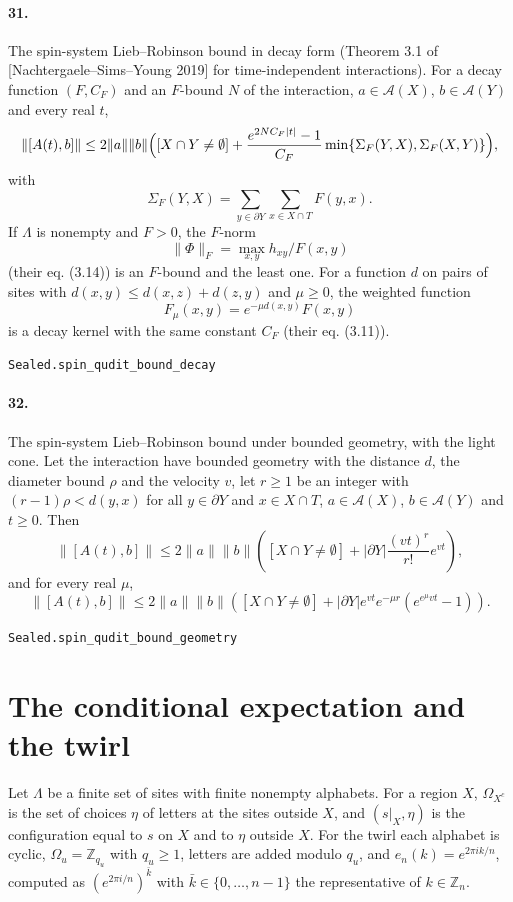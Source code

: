 \documentclass[11pt]{article}
\begin{document}
\paragraph{31.} The spin-system Lieb–Robinson bound in decay form (Theorem 3.1 of [Nachtergaele–Sims–Young 2019] for time-independent interactions). For a decay function $(F, C_F)$ and an $F$-bound $N$ of the interaction, $a \in \mathcal A(X)$, $b \in \mathcal A(Y)$ and every real $t$, \[\|[A(t), b]\| \le 2\|a\|\|b\|\Bigl([X \cap Y \neq \emptyset] + \frac{e^{2 N C_F |t|} - 1}{C_F} \min\{\Sigma_F(Y, X), \Sigma_F(X, Y)\}\Bigr),\] with \[\Sigma_F(Y, X) = \sum_{y \in \partial Y} \sum_{x \in X \cap T} F(y, x).\] If $\Lambda$ is nonempty and $F > 0$, the $F$-norm \[\|\Phi\|_F = \max_{x, y} h_{x y} / F(x, y)\] (their eq. (3.14)) is an $F$-bound and the least one. For a function $d$ on pairs of sites with $d(x, y) \le d(x, z) + d(z, y)$ and $\mu \ge 0$, the weighted function \[F_\mu(x, y) = e^{-\mu d(x, y)} F(x, y)\] is a decay kernel with the same constant $C_F$ (their eq. (3.11)).\par{\footnotesize\texttt{Sealed.spin\_qudit\_bound\_decay}}

\paragraph{32.} The spin-system Lieb–Robinson bound under bounded geometry, with the light cone. Let the interaction have bounded geometry with the distance $d$, the diameter bound $\rho$ and the velocity $v$, let $r \ge 1$ be an integer with $(r - 1)\rho < d(y, x)$ for all $y \in \partial Y$ and $x \in X \cap T$, $a \in \mathcal A(X)$, $b \in \mathcal A(Y)$ and $t \ge 0$. Then \[\|[A(t), b]\| \le 2\|a\|\|b\|([X \cap Y \neq \emptyset] + |\partial Y| \frac{(vt)^r}{r!} e^{vt}),\] and for every real $\mu$, \[\|[A(t), b]\| \le 2\|a\|\|b\|([X \cap Y \neq \emptyset] + |\partial Y| e^{vt} e^{-\mu r} (e^{e^\mu v t} - 1)).\]\par{\footnotesize\texttt{Sealed.spin\_qudit\_bound\_geometry}}

\section*{The conditional expectation and the twirl}
Let $\Lambda$ be a finite set of sites with finite nonempty alphabets. For a region $X$, $\Omega_{X^c}$ is the set of choices $\eta$ of letters at the sites outside $X$, and $(s|_X, \eta)$ is the configuration equal to $s$ on $X$ and to $\eta$ outside $X$. For the twirl each alphabet is cyclic, $\Omega_u = \mathbb Z_{q_u}$ with $q_u \ge 1$, letters are added modulo $q_u$, and $e_n(k) = e^{2\pi i k / n}$, computed as $(e^{2\pi i / n})^{\bar k}$ with $\bar k \in \{0, \dots, n - 1\}$ the representative of $k \in \mathbb Z_n$.
\end{document}
